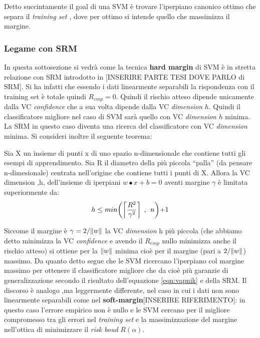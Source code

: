 Detto succintamente il goal di una \ac{SVM} è trovare l'iperpiano canonico ottimo che separa il \textit{training set} , dove per ottimo si intende quello che massimizza il margine.\\

\subsubsection{Legame con SRM}
\label{subsub:lsrm}
In questa sottosezione si vedrà come la tecnica \textbf{hard margin} di \ac{SVM} è in stretta relazione con \ac{SRM} introdotto in [INSERIRE PARTE TESI DOVE  PARLO di SRM]. Si ha infatti che essendo i dati linearmente separabili la rispondenza con il training set è totale quindi $R_{emp}=0$. Quindi il rischio atteso dipende unicamente dalla \ac{VC} \textit{confidence} che a sua volta dipende dalla \ac{VC} \textit{dimension} $h$. Quindi il classificatore migliore nel caso di \ac{SVM} sarà quello con \ac{VC} \textit{dimension} $h$ minima.  La \ac{SRM} in questo caso diventa una ricerca del classificatore con \ac{VC} \textit{dimension} minima. Si consideri inoltre il seguente teorema:
\begin{teorema}
\label{teo:suphdim}
Sia X un insieme di punti x di uno spazio n-dimensionale  che contiene tutti gli esempi di apprendimento. Sia R il diametro della più piccola ``palla'' (da pensare n-dimesionale) centrata nell'origine che contiene tutti i punti di X. Allora la \ac{VC} dimension ,h, dell'insieme di iperpiani $w \bullet x + b = 0$ aventi margine $\gamma$ è limitata superiormente da: 
\begin{equation*}
h \leq min \biggl( \ceil*{\frac{R^{2}}{\gamma^{2}}} \:\:,\:\: n \biggl) + 1
\end{equation*}
\end{teorema}
Siccome il margine è $\gamma = 2/\lVert w\rVert$ la \ac{VC} \textit{dimension} h più piccola (che abbiamo detto minimizza la \ac{VC} \textit{confidence} e avendo il $R_{emp}$ nullo minimizza anche il rischio atteso) si ottiene per la $\lVert w\rVert$ minima cioè per il margine (pari a $2/\lVert w\rVert$) massimo.  Da quanto detto segue che le \ac{SVM} ricercano l'iperpiano col margine massimo per ottenere il classificatore migliore che da cioè più garanzie di generalizzazione secondo il risultato dell'equazione \eqref{eqn:vapnik} e della \ac{SRM}.
Il discorso è analogo ,ma leggermente differente, nel caso in cui i dati non sono linearmente separabili come nel \textbf{soft-margin}[INSERIRE RIFERIMENTO]: in questo caso l'errore empirico non è nullo e le \ac{SVM} cercano per il migliore compromesso tra gli errori nel \textit{training set} e la massimizzazione del margine nell'ottica di minimizzare il \textit{risk boud} $R(\alpha)$.

